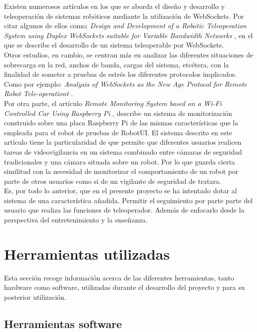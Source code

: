 \documentclass[a4paper,12pt]{article}
\begin{document}
Existen numerosos artículos en los que se aborda el diseño y desarrollo y teleoperación de sistemas robóticos mediante la utilización de WebSockets. Por citar algunos de ellos como; \emph{Design and Development of a Robotic Teleoperation System using
Duplex WebSockets suitable for Variable Bandwidth Networks} \cite{article:1}, en el que se describe el desarrollo de un sistema teleoperable por WebSockets.\\
  
Otros estudios, en cambio, se centran más en analizar las diferentes situaciones de sobrecarga en la red, anchos de banda, cargas del sistema, etcétera, con la finalidad de someter a pruebas de estrés
los diferentes protocolos implicados. Como por ejemplo: \emph{Analysis of WebSockets as the New Age Protocol for Remote Robot Tele-operationt} \cite{article:2}.\\
  
Por otra parte, el artículo \emph{ Remote Monitoring System based on a Wi-Fi Controlled Car Using Raspberry Pi } \cite{article:3}, describe un sistema de monitorización construido sobre una placa 
Raspberry Pi de las mismas características que la empleada para el robot de pruebas de RobotUI. El sistema descrito en este artículo tiene la particularidad de que permite que diferentes usuarios realicen tareas de videovigilancia en un sistema combinado entre cámaras de seguridad tradicionales y una cámara situada sobre un robot.
Por lo que guarda cierta similitud con la necesidad de monitorizar el comportamiento de un robot por parte de otros usuarios como si de un vigilante de seguridad de tratara.\\ 
  
Es, por todo lo anterior, que en el presente proyecto se ha intentado dotar al sistema de una característica añadida. Permitir el seguimiento por parte parte del usuario que realiza las funciones de teleoperador. Además de enfocarlo
desde la perspectiva del entretenimiento y la enseñanza.\\


\section{Herramientas utilizadas}

Esta sección recoge información acerca de las diferentes herramientas, tanto hardware como software, utilizadas durante el desarrollo del proyecto y para su posterior utilización. 

\subsection {Herramientas software}
\end{document}
